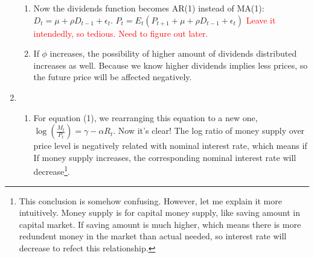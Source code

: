 \documentclass[11pt]{article} %
\begin{document}
\begin{enumerate}
\begin{enumerate}
            \item Now the dividends function becomes AR(1) instead of MA(1): $D_t=\mu+\rho D_{t-1}+\epsilon_t$. $P_t=E_t(P_{t+1}+\mu+\rho D_{t-1}+\epsilon_t)$
            \textcolor{red}{Leave it intendedly, so tedious. Need to figure out later.}
            \item If $\phi$ increases, the possibility of higher amount of dividends distributed increases as well. Because we know higher dividends implies less prices, so the future price will be affected negatively. 
        \end{enumerate}
    
    \item \begin{enumerate}
        \item For equation (1), we rearranging this equation to a new one, $\log(\frac{M_t}{P_t})=\gamma-\alpha R_t$. Now it's clear! The log ratio of money supply over price level is negatively related with nominal interest rate, which means if 
              If money supply increases, the corresponding nominal interest rate will decrease\footnote{This conclusion is somehow confusing. However, let me explain it more intuitively. Money supply is for capital money supply, like saving amount in capital market.
              If saving amount is much higher, which means there is more redundent money in the market than actual needed, so interest rate will decrease to refect this relationship.}.
              

\end{enumerate}
\end{enumerate}
\end{document}
